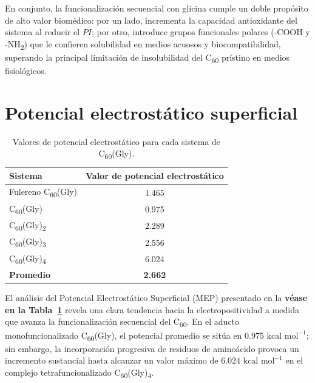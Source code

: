 En conjunto, la funcionalización secuencial con glicina cumple un doble propósito de alto valor biomédico: por un lado, incrementa la capacidad antioxidante del sistema al reducir el $PI$; por otro, introduce grupos funcionales polares (-COOH y -NH\textsubscript{2}) que le confieren solubilidad en medios acuosos y biocompatibilidad, superando la principal limitación de insolubilidad del C\textsubscript{60} prístino en medios fisiológicos.


    
    \section{Potencial electrostático superficial}
     \begin{table}[H]
    \centering
    \caption{Valores de potencial electrostático para cada sistema de C\textsubscript{60}(Gly).}
    \label{tab:potencial-electrostatico}
    \renewcommand{\arraystretch}{1.15}
    \begin{tabular}{lc}
        \toprule
        \textbf{Sistema} & \textbf{Valor de potencial electrostático} \\
        \midrule
        Fulereno C\textsubscript{60}(Gly) & 1.465 \\
       C\textsubscript{60}(Gly) & 0.975 \\
        C\textsubscript{60}(Gly)\textsubscript{2} & 2.289 \\
        C\textsubscript{60}(Gly)\textsubscript{3} & 2.556 \\
        C\textsubscript{60}(Gly)\textsubscript{4} & 6.024 \\
        \midrule
        \textbf{Promedio} & \textbf{2.662} \\
        \bottomrule
        \end{tabular}
\end{table}

El análisis del Potencial Electrostático Superficial (MEP) presentado en la \textbf{\textbf{véase en la Tabla~\ref{tab:potencial-electrostatico}}} revela una clara tendencia hacia la electropositividad a medida que avanza la funcionalización secuencial del C\textsubscript{60}. En el aducto monofuncionalizado C\textsubscript{60}(Gly), el potencial promedio se sitúa en $0.975\text{ kcal mol}^{-1}$; sin embargo, la incorporación progresiva de residuos de aminoácido provoca un incremento sustancial hasta alcanzar un valor máximo de $6.024\text{ kcal mol}^{-1}$ en el complejo tetrafuncionalizado C\textsubscript{60}(Gly)\textsubscript{4}. 


